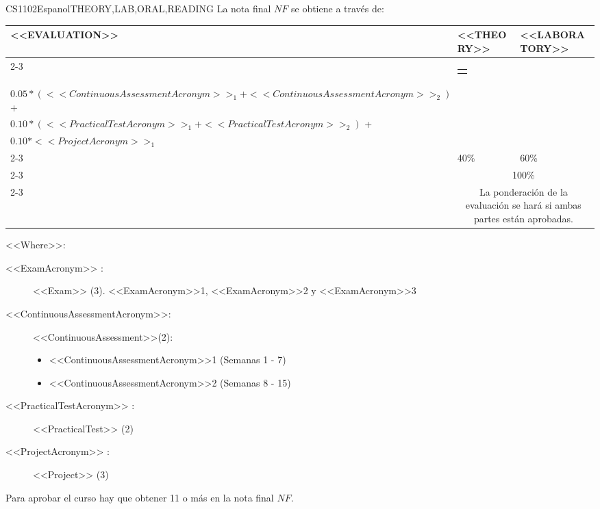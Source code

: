   \begin{evaluation}{CS1102}{Espanol}{THEORY,LAB,ORAL,READING}
  La nota final $NF$ se obtiene a través de: \\
 
  \begin{tabularx}{0.9\textwidth}{|X|p{}|p{}|} \hline
  \multirow{4}{*}{\uppercase{<<Evaluation>>}} & \uppercase{<<Theory>>} & \uppercase{<<Laboratory>>} \\ \cline{2-3}
  & %
      \begin{minipage}{0.95\textwidth}
      \begin{tabular}{l}
          $0.40*<<ExamAcronym>>_{1}$
          \end{tabular} 
      \end{minipage} 
  & %
      \begin{minipage}{0.95\textwidth}
      \begin{tabular}{l}
        $0.10*(<<ExamAcronym>>_{2} + <<ExamAcronym>>_{3})$ + \\
        $0.05*(<<ContinuousAssessmentAcronym>>_{1} + <<ContinuousAssessmentAcronym>>_{2})$ + \\
        $0.10*(<<PracticalTestAcronym>>_{1} + <<PracticalTestAcronym>>_{2})$ + \\
        $0.10*<<ProjectAcronym>>_{1}$
      \end{tabular} 
      \end{minipage}                 \\ \cline{2-3}
  & %
  40\% 
  & %
  60\% \\ \cline{2-3}
  & \multicolumn{2}{|c|}{100\%}  \\ \cline{2-3}
  & \multicolumn{2}{|c|}{La ponderación de la evaluación se hará si ambas partes están aprobadas.}  \\ \hline
  \end{tabularx}
    
  \vspace{2mm}
  \noindent <<Where>>:
  \begin{description}
      \item[<<ExamAcronym>> :] <<Exam>> (3). <<ExamAcronym>>1, <<ExamAcronym>>2 y <<ExamAcronym>>3
      \item[<<ContinuousAssessmentAcronym>>:]<<ContinuousAssessment>>(2):
      \begin{itemize}
              \item <<ContinuousAssessmentAcronym>>1 (Semanas 1 - 7) 
              \item <<ContinuousAssessmentAcronym>>2 (Semanas 8 - 15)
      \end{itemize}
      \item[<<PracticalTestAcronym>> :] <<PracticalTest>>  (2)
      \item[<<ProjectAcronym>> :] <<Project>> (3)
  \end{description}
 
  \noindent Para aprobar el curso hay que obtener 11 o más en la nota final $NF$.
  \end{evaluation}
 
